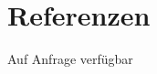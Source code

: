 \documentclass{cv}
\begin{document}
\section{Referenzen}
\begin{description}
    \item[Auf Anfrage verfügbar]
\end{description}
\end{document}
